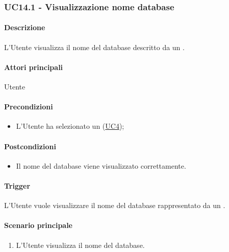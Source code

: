
\subsubsection{UC14.1 - Visualizzazione nome database}\label{UC14point1}
\paragraph*{Descrizione}
L'Utente visualizza il nome del database descritto da un .

\paragraph*{Attori principali}
Utente

\paragraph*{Precondizioni}
\begin{itemize}
  \item L'Utente ha selezionato un  (\hyperref[UC4]{UC4});
\end{itemize}

\paragraph*{Postcondizioni}
\begin{itemize}
  \item Il nome del database viene visualizzato correttamente.
\end{itemize}

\paragraph*{Trigger}
L'Utente vuole visualizzare il nome del database rappresentato da un .

\paragraph*{Scenario principale}
\begin{enumerate}
  \item L'Utente visualizza il nome del database.
\end{enumerate}


